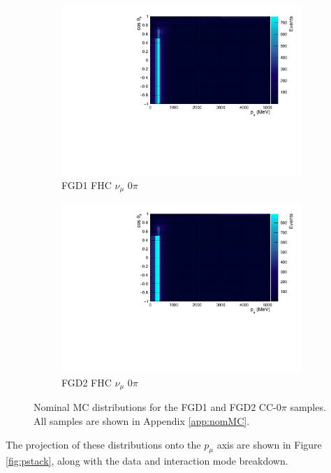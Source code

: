 \begin{figure}
\centering
\begin{subfigure}{.7\textwidth}
  \centering
  \includegraphics[width=0.95\linewidth]{figs/NomMC_MC_FGD1_numuCC_0pi}
  \caption{FGD1 FHC $\nu_{\mu}$ 0$\pi$}
  \label{fig:2d_FGD1_numuCC_0pi}
\end{subfigure}
\begin{subfigure}{.7\textwidth}
  \centering
  \includegraphics[width=0.95\linewidth]{figs/NomMC_MC_FGD2_numuCC_0pi}
  \caption{FGD2 FHC $\nu_{\mu}$ 0$\pi$}
  \label{fig:2d_FGD2_numuCC_0pi}
\end{subfigure}
\caption{Nominal MC distributions for the FGD1 and FGD2 CC-0$\pi$ samples. All samples are shown in Appendix \ref{app:nomMC}.}
\label{fig:2dnom}
\end{figure}

The projection of these distributions onto the $p_{\mu}$ axis are shown in Figure \ref{fig:pstack}, along with the data and interaction mode breakdown.


